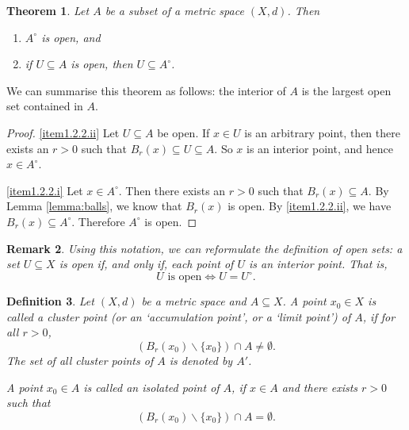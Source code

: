 \documentclass[a4paper,reqno]{amsart}
\numberwithin{equation}{section}
\newtheorem{definition}{Definition}[section]
\newtheorem{theorem}[definition]{Theorem}
\newtheorem{remark}[definition]{Remark}
\begin{document}
\begin{theorem} \label{thm:interior}
Let $A$ be a subset of a metric space $(X,d)$. Then
\begin{enumerate}
\item \label{item1.2.2.i} $A^\circ$ is open, and
\item \label{item1.2.2.ii} if $U \subseteq A$ is open, then $U \subseteq A^\circ$.
\end{enumerate}
\end{theorem}

We can summarise this theorem as follows: the interior of $A$ is the largest
open set contained in $A$.

\begin{proof}
\eqref{item1.2.2.ii} Let $U \subseteq A$ be open. If $x \in U$ is an
arbitrary point, then there exists an $r > 0$ such that $B_r(x) \subseteq U \subseteq A$.
So $x$ is an interior point, and hence $x \in A^\circ$.

\eqref{item1.2.2.i} Let $x \in A^\circ$. Then there exists an $r > 0$ such that
$B_r(x) \subseteq A$. By Lemma \ref{lemma:balls}, we know that $B_r(x)$ is open.
By \eqref{item1.2.2.ii}, we have $B_r(x) \subseteq A^\circ$. Therefore $A^\circ$ is open.
\end{proof}


\begin{remark}
Using this notation, we can reformulate the definition of open sets: a set
$U \subseteq X$ is open if, and only if, each point of $U$ is an interior point.
That is,
\[
U \mbox{ is open} \Leftrightarrow U = U^\circ.
\]
\end{remark}



\bigskip



\begin{definition}
Let $(X,d)$ be a metric space and $A \subseteq X$. A point $x_0 \in X$ is
called a \emph{cluster point} (or an `accumulation point', or a `limit point') of $A$, if for all
$r > 0$,
\[
(B_r(x_0) \backslash \{x_0\}) \cap A \not= \emptyset.
\]
The set of all cluster points of $A$ is denoted by $A'$.

\medskip

A point $x_0 \in A$ is called an \emph{isolated point} of $A$, if $x\in A$ and there exists $r > 0$ such that
\[
(B_r(x_0) \backslash \{x_0\}) \cap A  = \emptyset.
\]

\end{definition}
\end{document}
